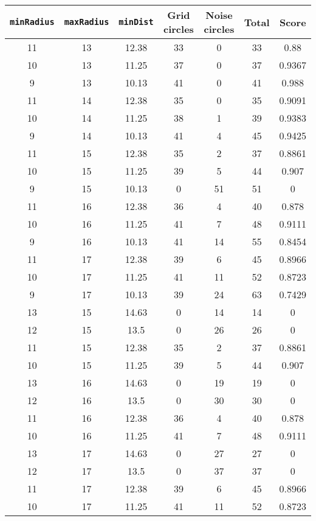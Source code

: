 \documentclass[letterpaper, 12pt]{article}
\begin{document}
\begin{longtable}{|c|c|c|c|c|c|c|}
\hline
\textbf{\texttt{minRadius}} & \textbf{\texttt{maxRadius}} & \textbf{\texttt{minDist}} & \textbf{Grid circles} & \textbf{Noise circles} & \textbf{Total} & \textbf{Score} \\
\hline
11 & 13 & 12.38 & 33 & 0 & 33 & 0.88 \\
\hline
10 & 13 & 11.25 & 37 & 0 & 37 & 0.9367 \\
\hline
9 & 13 & 10.13 & 41 & 0 & 41 & 0.988 \\
\hline
11 & 14 & 12.38 & 35 & 0 & 35 & 0.9091 \\
\hline
10 & 14 & 11.25 & 38 & 1 & 39 & 0.9383 \\
\hline
9 & 14 & 10.13 & 41 & 4 & 45 & 0.9425 \\
\hline
11 & 15 & 12.38 & 35 & 2 & 37 & 0.8861 \\
\hline
10 & 15 & 11.25 & 39 & 5 & 44 & 0.907 \\
\hline
9 & 15 & 10.13 & 0 & 51 & 51 & 0 \\
\hline
11 & 16 & 12.38 & 36 & 4 & 40 & 0.878 \\
\hline
10 & 16 & 11.25 & 41 & 7 & 48 & 0.9111 \\
\hline
9 & 16 & 10.13 & 41 & 14 & 55 & 0.8454 \\
\hline
11 & 17 & 12.38 & 39 & 6 & 45 & 0.8966 \\
\hline
10 & 17 & 11.25 & 41 & 11 & 52 & 0.8723 \\
\hline
9 & 17 & 10.13 & 39 & 24 & 63 & 0.7429 \\
\hline
13 & 15 & 14.63 & 0 & 14 & 14 & 0 \\
\hline
12 & 15 & 13.5 & 0 & 26 & 26 & 0 \\
\hline
11 & 15 & 12.38 & 35 & 2 & 37 & 0.8861 \\
\hline
10 & 15 & 11.25 & 39 & 5 & 44 & 0.907 \\
\hline
13 & 16 & 14.63 & 0 & 19 & 19 & 0 \\
\hline
12 & 16 & 13.5 & 0 & 30 & 30 & 0 \\
\hline
11 & 16 & 12.38 & 36 & 4 & 40 & 0.878 \\
\hline
10 & 16 & 11.25 & 41 & 7 & 48 & 0.9111 \\
\hline
13 & 17 & 14.63 & 0 & 27 & 27 & 0 \\
\hline
12 & 17 & 13.5 & 0 & 37 & 37 & 0 \\
\hline
11 & 17 & 12.38 & 39 & 6 & 45 & 0.8966 \\
\hline
10 & 17 & 11.25 & 41 & 11 & 52 & 0.8723 \\

\end{longtable}
\end{document}
